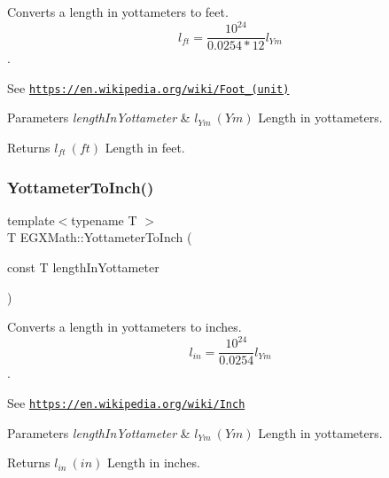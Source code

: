 Converts a length in yottameters to feet. \[ l_{ft}= \frac{10^{24}}{0.0254 * 12} l_{Ym} \]. 

See \href{https://en.wikipedia.org/wiki/Foot_(unit)}{\tt https\+://en.\+wikipedia.\+org/wiki/\+Foot\+\_\+(unit)} 
\begin{DoxyParams}{Parameters}
{\em length\+In\+Yottameter} & $ l_{Ym}\ (Ym)$ Length in yottameters. \\
\hline
\end{DoxyParams}
\begin{DoxyReturn}{Returns}
$ l_{ft}\ (ft)$ Length in feet. 
\end{DoxyReturn}
\mbox{\label{group___e_g_x_math-_conversions-_length_conversions-_s_i-_yottameter-_imperial_ga6de8b1bd4812d6814328cb5d54adf08c}} 
\subsubsection{\texorpdfstring{Yottameter\+To\+Inch()}{YottameterToInch()}}
{\footnotesize\ttfamily template$<$typename T $>$ \\
T E\+G\+X\+Math\+::\+Yottameter\+To\+Inch (\begin{DoxyParamCaption}\item[{const T}]{length\+In\+Yottameter }\end{DoxyParamCaption})}



Converts a length in yottameters to inches. \[ l_{in}= \frac{10^{24}}{0.0254} l_{Ym} \]. 

See \href{https://en.wikipedia.org/wiki/Inch}{\tt https\+://en.\+wikipedia.\+org/wiki/\+Inch} 
\begin{DoxyParams}{Parameters}
{\em length\+In\+Yottameter} & $ l_{Ym}\ (Ym)$ Length in yottameters. \\
\hline
\end{DoxyParams}
\begin{DoxyReturn}{Returns}
$ l_{in}\ (in)$ Length in inches. 
\end{DoxyReturn}
\mbox{\label{group___e_g_x_math-_conversions-_length_conversions-_s_i-_yottameter-_imperial_ga71ee7b2256fffaec2663bd2eafc30a9d}} 

